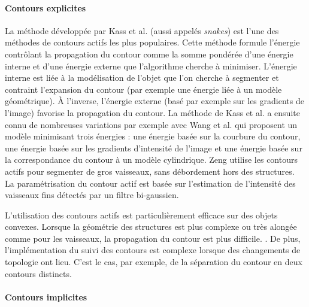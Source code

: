 
      \paragraph{Contours explicites}

      La méthode développée par Kass et al. \cite{Kass1988_snakes} (aussi appelés \textit{snakes}) est l'une des méthodes de contours actifs les plus populaires. Cette méthode formule l'énergie contrôlant la propagation du contour comme la somme pondérée d'une énergie interne et d'une énergie externe que l'algorithme cherche à minimiser. L'énergie interne est liée à la modélisation de l'objet que l'on cherche à segmenter et contraint l'expansion du contour (par exemple une énergie liée à un modèle géométrique). À l'inverse, l'énergie externe (basé par exemple sur les gradients de l'image) favorise la propagation du contour. La méthode de Kass et al. a ensuite connu de nombreuses variations par exemple avec Wang et al. \cite{Wang2012_vessel_level_set} qui proposent un modèle minimisant trois énergies : une énergie basée sur la courbure du contour, une énergie basée sur les gradients d'intensité de l'image et une énergie basée sur la correspondance du contour à un modèle cylindrique. Zeng \cite{Zeng2018_liver_hybrid_active_contour_region_growing} utilise les contours actifs pour segmenter de gros vaisseaux, sans débordement hors des structures. La paramétrisation du contour actif est basée sur l'estimation de l'intensité des vaisseaux fins détectés par un filtre bi-gaussien.

      L'utilisation des contours actifs est particulièrement efficace sur des objets convexes. Lorsque la géométrie des structures est plus complexe ou très alongée comme pour les vaisseaux, la propagation du contour est plus difficile. . De plus, l'implémentation du suivi des contours est complexe lorsque des changements de topologie ont lieu. C'est le cas, par exemple, de la séparation du contour en deux contours distincts.

      \paragraph{Contours implicites} 

